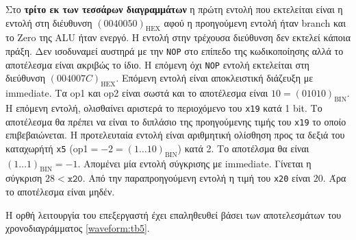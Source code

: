 Στο \textbf{τρίτο εκ των τεσσάρων διαγραμμάτων} η πρώτη εντολή που εκτελείται είναι η εντολή στη διέυθυνση $(0040050)_\mathrm{HEX}$ αφού η προηγούμενη εντολή ήταν branch και το Zero της ALU ήταν ενεργό. Η εντολή στην τρέχουσα διεύθυνση δεν εκτελεί κάποια πράξη. Δεν ισοδυναμεί αυστηρά με την \texttt{NOP} στο επίπεδο της κωδικοποίησης αλλά το αποτέλεσμα είναι ακριβώς το ίδιο. Η επόμενη όχι \texttt{NOP} εντολή εκτελείται στη διεύθυνση $(004007C)_\mathrm{HEX}$. Επόμενη εντολή είναι αποκλειστική διάζευξη με immediate. Τα op1 και op2 είναι σωστά και το αποτέλεσμα είναι $10=(01010)_\mathrm{BIN}$. Η επόμενη εντολή, ολισθαίνει αριστερά το περιοχόμενο του \texttt{x19} κατά 1 bit. Το αποτέλεσμα θα πρέπει να είναι το διπλάσιο της προηγούμενης τιμής του \texttt{x19} το οποίο επιβεβαιώνεται. Η προτελευταία εντολή είναι αριθμητική ολίσθηση προς τα δεξιά του καταχωρήτή \texttt{x5} (op1$=-2=(1\ldots10)_\mathrm{BIN}$) κατά 2. Το αποτέλσμα θα είναι $(1\ldots 1)_\mathrm{BIN}=-1$. Απομένει μία εντολή σύγκρισης με immediate. Γίνεται η σύγκριση $28<\texttt{x20}$. Από την παραπροηγούμενη εντολή η τιμή του \texttt{x20} είναι $20$. Άρα το αποτέλεσμα είναι μηδέν.\par

Η ορθή λειτουργία του επεξεργαστή έχει επαληθευθεί βάσει των αποτελεσμάτων του χρονοδιαγράμματος \ref{waveform:tb5}.\par